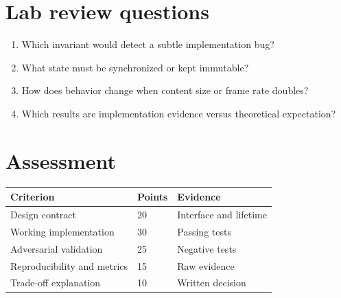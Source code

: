 \documentclass[11pt,letterpaper]{article}
\begin{document}
\section{Lab review questions}
\begin{enumerate}
\item Which invariant would detect a subtle implementation bug?
\item What state must be synchronized or kept immutable?
\item How does behavior change when content size or frame rate doubles?
\item Which results are implementation evidence versus theoretical expectation?
\end{enumerate}
\section{Assessment}
\small\begin{longtable}{|p{\dimexpr(\linewidth-6\tabcolsep-4\arrayrulewidth-1pt)/3\relax}|p{\dimexpr(\linewidth-6\tabcolsep-4\arrayrulewidth-1pt)/3\relax}|p{\dimexpr(\linewidth-6\tabcolsep-4\arrayrulewidth-1pt)/3\relax}|}
\hline \textbf{Criterion} & \textbf{Points} & \textbf{Evidence}\\ \hline\endhead
Design contract & 20 & Interface and lifetime\\ \hline
Working implementation & 30 & Passing tests\\ \hline
Adversarial validation & 25 & Negative tests\\ \hline
Reproducibility and metrics & 15 & Raw evidence\\ \hline
Trade-off explanation & 10 & Written decision\\ \hline
\end{longtable}\normalsize
\end{document}
